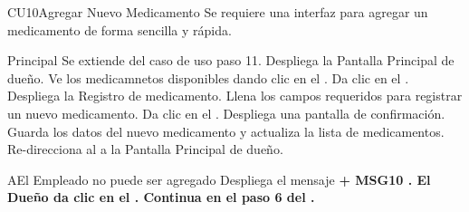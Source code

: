 \begin{UseCase}{CU10}{Agregar Nuevo Medicamento}{
		Se requiere una interfaz para agregar un medicamento de forma sencilla y rápida.
	}
	\end{UseCase}
	\begin{UCtrayectoria}{Principal}
		\UCpaso Se extiende del caso de uso  paso 11.
		\UCpaso Despliega la  {Pantalla Principal de dueño}.
		\UCpaso[\UCactor] Ve los medicamnetos disponibles dando clic en el .
		\UCpaso[\UCactor] Da clic en el  .
		\UCpaso Despliega la  {Registro de medicamento}.
		\UCpaso [\UCactor] Llena los campos requeridos para registrar un nuevo medicamento. 
		\UCpaso[\UCactor] Da clic en el  .
		\UCpaso Despliega una pantalla de confirmación. 
		\UCpaso Guarda los datos del nuevo medicamento y actualiza la lista de medicamentos.
		\UCpaso Re-direcciona al \UCactor a la  {Pantalla Principal de dueño}.
	
	\end{UCtrayectoria}


		\begin{UCtrayectoriaA}{A}{El Empleado no puede ser agregado}
			\UCpaso Despliega el mensaje \bf {+ MSG10 }.
			\UCpaso[\UCactor] El Dueño da clic en el .
			\UCpaso Continua en el paso 6 del .
		\end{UCtrayectoriaA}

